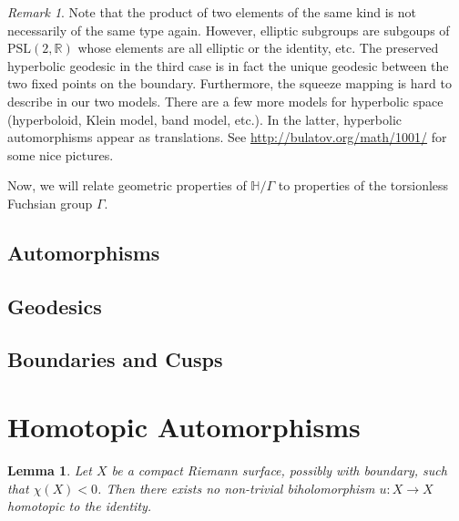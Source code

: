 \documentclass[a4paper]{article}
\newcommand{\RR}{\mathbb{R}}
\newcommand{\HH}{\mathbb{H}}
\newcommand{\lra}{\longrightarrow}
\newcommand{\PSL}{\mathrm{PSL}}
\newtheorem*{lem}{Lemma}
\theoremstyle{definition}
\theoremstyle{remark}
\newtheorem*{rmk}{Remark}
\theoremstyle{remark}
\begin{document}
\begin{rmk}
  Note that the product of two elements of the same kind is not necessarily of the same type again. However, elliptic subgroups are subgoups of $\PSL(2,\RR)$ whose elements are all elliptic or the identity, etc. The preserved hyperbolic geodesic in the third case is in fact the unique geodesic between the two fixed points on the boundary. Furthermore, the squeeze mapping is hard to describe in our two models. There are a few more models for hyperbolic space (hyperboloid, Klein model, band model, etc.). In the latter, hyperbolic automorphisms appear as translations. See \href{http://bulatov.org/math/1001/}{http://bulatov.org/math/1001/} for some nice pictures.
\end{rmk}

Now, we will relate geometric properties of $\HH/\Gamma$ to properties of the torsionless Fuchsian group $\Gamma$.

\subsection*{Automorphisms}

\subsection*{Geodesics}

\subsection*{Boundaries and Cusps}

\section*{Homotopic Automorphisms}

\begin{lem}
  Let $X$ be a compact Riemann surface, possibly with boundary, such that $\chi(X)<0$. Then there exists no non-trivial biholomorphism $u:X\lra X$ homotopic to the identity.
\end{lem}
\end{document}
